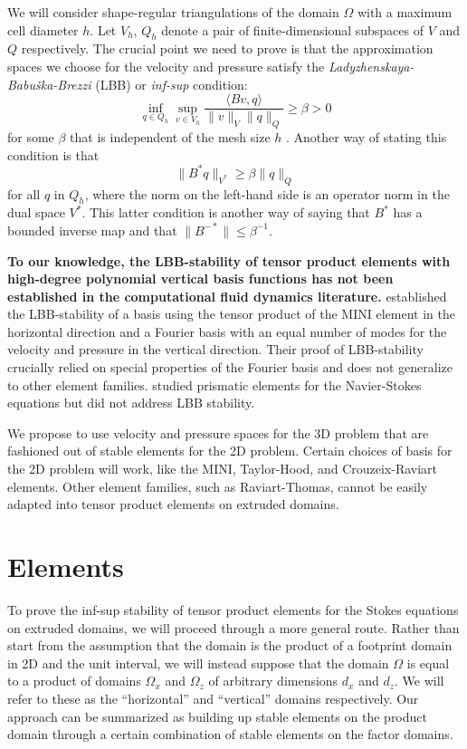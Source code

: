 \documentclass{article}
\theoremstyle{definition}
\theoremstyle{plain}
\begin{document}
We will consider shape-regular triangulations of the domain $\Omega$ with a maximum cell diameter $h$.
Let $V_h$, $Q_h$ denote a pair of finite-dimensional subspaces of $V$ and $Q$ respectively.
The crucial point we need to prove is that the approximation spaces we choose for the velocity and pressure satisfy the \emph{Ladyzhenskaya-Babu\v{s}ka-Brezzi} (LBB) or \emph{inf-sup} condition:
\begin{equation}
    \inf_{q\in Q_h}\sup_{v \in V_h}\frac{\langle Bv, q\rangle}{\|v\|_V\|q\|_Q} \ge \beta > 0
\end{equation}
for some $\beta$ that is independent of the mesh size $h$ \citep{boffi2013mixed}.
Another way of stating this condition is that
\begin{equation}
    \|B^*q\|_{V^*} \ge \beta\|q\|_Q
\end{equation}
for all $q$ in $Q_h$, where the norm on the left-hand side is an operator norm in the dual space $V^*$.
This latter condition is another way of saying that $B^*$ has a bounded inverse map and that $\|B^{-*}\| \le \beta^{-1}$.

\textbf{To our knowledge, the LBB-stability of tensor product elements with high-degree polynomial vertical basis functions has not been established in the computational fluid dynamics literature.}
\citet{canuto1984combined} established the LBB-stability of a basis using the tensor product of the MINI element in the horizontal direction and a Fourier basis with an equal number of modes for the velocity and pressure in the vertical direction.
Their proof of LBB-stability crucially relied on special properties of the Fourier basis and does not generalize to other element families.
\citet{nakahashi1989finite} studied prismatic elements for the Navier-Stokes equations but did not address LBB stability.

We propose to use velocity and pressure spaces for the 3D problem that are fashioned out of stable elements for the 2D problem.
Certain choices of basis for the 2D problem will work, like the MINI, Taylor-Hood, and Crouzeix-Raviart elements.
Other element families, such as Raviart-Thomas, cannot be easily adapted into tensor product elements on extruded domains.


\section{Elements}

To prove the inf-sup stability of tensor product elements for the Stokes equations on extruded domains, we will proceed through a more general route.
Rather than start from the assumption that the domain is the product of a footprint domain in 2D and the unit interval, we will instead suppose that the domain $\Omega$ is equal to a product of domains $\Omega_x$ and $\Omega_z$ of arbitrary dimensions $d_x$ and $d_z$.
We will refer to these as the ``horizontal'' and ``vertical'' domains respectively.
Our approach can be summarized as building up stable elements on the product domain through a certain combination of stable elements on the factor domains.
\end{document}
